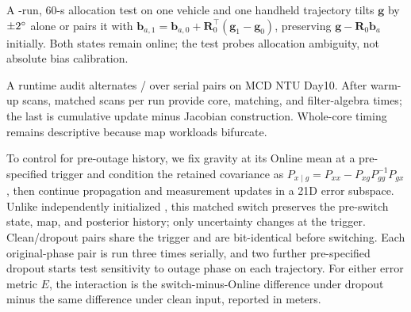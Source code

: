 A \NumCoupledStateRuns{}-run, 60-s allocation test on one vehicle and one
handheld trajectory tilts $\mathbf g$ by $\pm2{}^\circ$
alone or pairs it with $\mathbf b_{a,1}=\mathbf b_{a,0}+\mathbf
R_0^\top(\mathbf g_1-\mathbf g_0)$, preserving $\mathbf g-\mathbf R_0\mathbf
b_a$ initially. Both states remain online; the test probes allocation
ambiguity, not absolute bias calibration.

A runtime audit alternates \methodA{}/\methodG{} over \NumRuntimePairs{} serial
pairs on MCD NTU Day10. After \NumRuntimeWarmupScans{} warm-up scans,
\NumRuntimeTimedScans{} matched scans per run provide core, matching, and
filter-algebra times; the last is cumulative update minus Jacobian construction.
Whole-core timing remains descriptive because map workloads bifurcate.

To control for pre-outage history, we fix gravity at its Online mean at a
pre-specified trigger and condition the retained covariance as
$P_{x\mid g}=P_{xx}-P_{xg}P_{gg}^{-1}P_{gx}$, then continue propagation and
measurement updates in a 21D error subspace. Unlike independently initialized
\methodG{}, this matched switch preserves the pre-switch state, map, and
posterior history; only uncertainty changes at the trigger. Clean/dropout
pairs share the trigger and are bit-identical before switching. Each
original-phase pair is run three times serially, and two further pre-specified
dropout starts test sensitivity to outage phase on each trajectory.
For either error metric $E$, the interaction is the switch-minus-Online
difference under dropout minus the same difference under clean input,
reported in meters.

